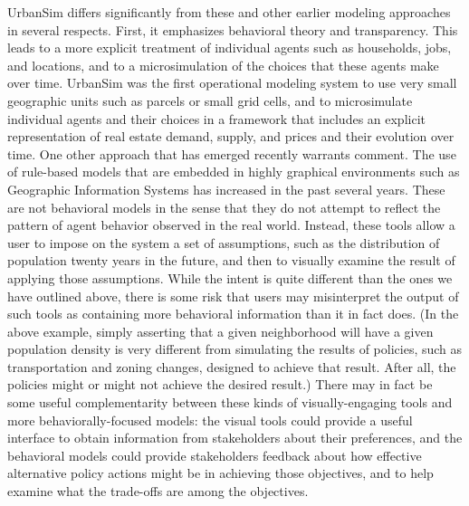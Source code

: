 UrbanSim differs significantly from these and other earlier modeling
approaches in several respects.  First, it emphasizes behavioral
theory and transparency.  This leads to a more explicit treatment of
individual agents such as households, jobs, and locations, and to a
microsimulation of the choices that these agents make over time.
UrbanSim was the first operational modeling system to use very small
geographic units such as parcels or small grid cells, and to
microsimulate individual agents and their choices in a framework
that includes an explicit representation of real estate demand,
supply, and prices and their evolution over time.  One other
approach that has emerged recently warrants comment.  The use of
rule-based models that are embedded in highly graphical environments
such as Geographic Information Systems has increased in the past
several years. These are not behavioral models in the sense that
they do not attempt to reflect the pattern of agent behavior
observed in the real world. Instead, these tools allow a user to
impose on the system a set of assumptions, such as the distribution
of population twenty years in the future, and then to visually
examine the result of applying those assumptions.  While the intent
is quite different than the ones we have outlined above, there is
some risk that users may misinterpret the output of such tools as
containing more behavioral information than it in fact does.  (In the above
example, simply asserting that a given neighborhood will have a
given population density is very different from simulating the
results of policies, such as transportation and zoning changes,
designed to achieve that result. After all, the policies might or
might not achieve the desired result.)  There may in fact be some
useful complementarity between these kinds of visually-engaging
tools and more behaviorally-focused models: the visual tools could
provide a useful interface to obtain information from stakeholders
about their preferences, and the behavioral models could provide
stakeholders feedback about how effective alternative policy actions
might be in achieving those objectives, and to help examine what the
trade-offs are among the objectives.

